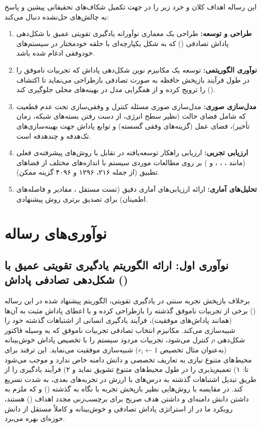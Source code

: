 \documentclass[oneside,openany,phd]{TMU-Thesis}
\begin{document}
این رساله اهداف کلان و خرد زیر را در جهت تکمیل شکاف‌های تحقیقاتی پیشین \cite{RS_DRL_Article} و پاسخ به چالش‌های حل‌نشده دنبال می‌کند:

\begin{enumerate}
    \item \textbf{طراحی و توسعه:} طراحی یک معماری نوآورانه یادگیری تقویتی عمیق با شکل‌دهی پاداش تصادفی () که به شکل یکپارچه‌ای با حلقه خودمختار  در سیستم‌های خودوفقی ادغام شده باشد.
    \item \textbf{نوآوری الگوریتمی:} توسعه یک مکانیزم نوین شکل‌دهی پاداش که تجربیات ناموفق را در طول فرآیند بازپخش حافظه به صورت تصادفی بازطراحی می‌نماید تا اکتشاف () را ترویج کرده و از همگرایی مدل در بهینه‌های محلی جلوگیری کند.
    \item \textbf{مدل‌سازی صوری:} مدل‌سازی صوری مسئله کنترل و وفقی‌سازی تحت عدم قطعیت که شامل فضای حالت (نظیر سطح انرژی، از دست رفتن بسته‌های شبکه، زمان تأخیر)، فضای عمل (گزینه‌های وفقی گسسته) و توابع پاداش جهت بهینه‌سازی‌های تک‌هدفه و چندهدفه است.
    \item \textbf{ارزیابی تجربی:} ارزیابی راهکار توسعه‌یافته  در تقابل با روش‌های پیشرفته‌ی فعلی (مانند ، ، ،  و ) بر روی مطالعات موردی سیستم  با اندازه‌های مختلف از فضاهای تطبیق (از جمله ۲۱۶، ۱۲۹۶ و ۴۰۹۶ گزینه ممکن).
    \item \textbf{تحلیل‌های آماری:} ارائه ارزیابی‌های آماری دقیق (تست مستقل ، مقادیر  و فاصله‌های اطمینان) برای تصدیق برتری روش پیشنهادی.
\end{enumerate}

\section{نوآوری‌های رساله}

\subsection{نوآوری اول: ارائه الگوریتم یادگیری تقویتی عمیق با شکل‌دهی تصادفی پاداش ()}
برخلاف بازپخش تجربه سنتی در یادگیری تقویتی، الگوریتم پیشنهاد شده در این رساله () برخی از تجربیات ناموفق گذشته را بازطراحی کرده و با اعطای پاداش مثبت به آن‌ها (همانند پاداش‌های موفقیت)، فرآیند یادگیری انسانی از اشتباهات گذشته خود را شبیه‌سازی می‌کند. مکانیزم انتخاب تصادفی تجربیات ناموفق که به وسیله فاکتور شکل‌دهی $\rho$ کنترل می‌شود، تجربیات مردود سیستم را با تخصیص پاداش خوش‌بینانه (به‌عنوان مثال تخصیص $r_i \leftarrow 1$) شبیه‌سازی موفقیت می‌نماید. این ترفند برای محیط‌های متنوع نیازی به تعاریف تخصصی و دانش دامنه خاص ندارد و موجب می‌شود تا: ۱) تعمیم‌پذیری را در طول محیط‌های متنوع تشویق نماید و ۲) فرآیند یادگیری را از طریق تبدیل اشتباهات گذشته به درس‌های با ارزش در تجربه‌های بعدی، به شدت تسریع کند.
در مقایسه با روش‌هایی نظیر بازپخش تجربه با نگاه به گذشته () و  که ملزم به داشتن دانش دامنه‌ای و داشتن هدف صریح برای برچسب‌زنی مجدد اهداف () هستند، رویکرد ما در  از استراتژی پاداش تصادفی و خوش‌بینانه و کاملاً مستقل از دانش حوزه‌ای بهره می‌برد.
\end{document}
